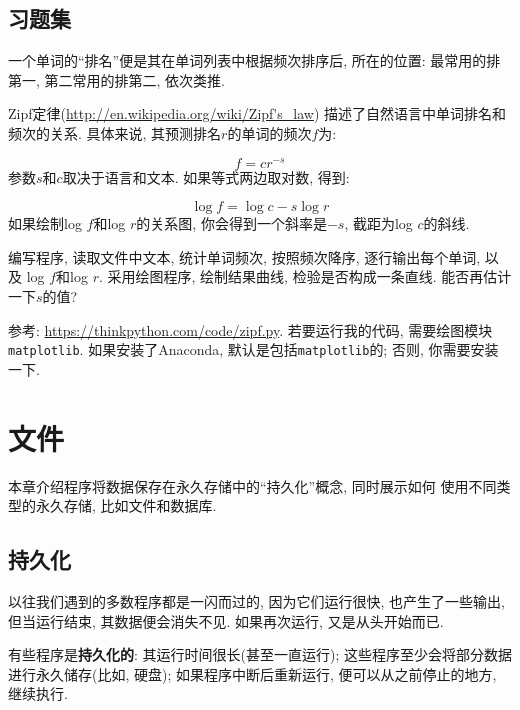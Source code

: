 \documentclass[10pt]{book}
\begin{document}
\section{习题集}

\begin{exercise}

一个单词的``排名''便是其在单词列表中根据频次排序后, 所在的位置:
最常用的排第一, 第二常用的排第二, 依次类推. 

Zipf定律(\url{http://en.wikipedia.org/wiki/Zipf's_law})
描述了自然语言中单词排名和频次的关系. 
具体来说, 其预测排名$r$的单词的频次$f$为:

\[ f = c r^{-s} \]
%
参数$s$和$c$取决于语言和文本. 
如果等式两边取对数, 得到:

\[ \log f = \log c - s \log r \]
%
如果绘制log $f$和log $r$的关系图, 你会得到一个斜率是$-s$, 截距为log $c$的斜线. 

编写程序, 读取文件中文本, 
统计单词频次, 按照频次降序, 逐行输出每个单词, 以及
log $f$和log $r$. 
采用绘图程序, 绘制结果曲线, 检验是否构成一条直线. 
能否再估计一下$s$的值?

参考: \url{https://thinkpython.com/code/zipf.py}.
若要运行我的代码, 需要绘图模块{\tt matplotlib}.
如果安装了Anaconda, 默认是包括{\tt matplotlib}的;
否则, 你需要安装一下. 

\end{exercise}



\chapter{文件}

本章介绍程序将数据保存在永久存储中的``持久化''概念, 同时展示如何
使用不同类型的永久存储, 比如文件和数据库. 


\section{持久化}

以往我们遇到的多数程序都是一闪而过的, 因为它们运行很快, 也产生了一些输出, 
但当运行结束, 其数据便会消失不见. 
如果再次运行, 又是从头开始而已. 

有些程序是{\bf 持久化的}: 其运行时间很长(甚至一直运行);
这些程序至少会将部分数据进行永久储存(比如, 硬盘);
如果程序中断后重新运行, 便可以从之前停止的地方, 继续执行. 
\end{document}
